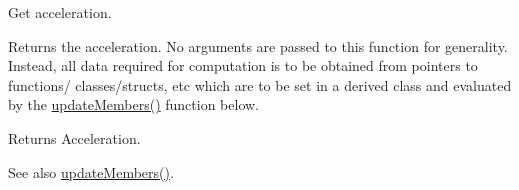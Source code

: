 Get acceleration. 

Returns the acceleration. No arguments are passed to this function for generality. Instead, all data required for computation is to be obtained from pointers to functions/ classes/structs, etc which are to be set in a derived class and evaluated by the \hyperlink{classtudat_1_1basic__astrodynamics_1_1AccelerationModel_a966e85b72300b8cbc99ba60e40108d71}{update\+Members()} function below. \begin{DoxyReturn}{Returns}
Acceleration. 
\end{DoxyReturn}
\begin{DoxySeeAlso}{See also}
\hyperlink{classtudat_1_1basic__astrodynamics_1_1AccelerationModel_a966e85b72300b8cbc99ba60e40108d71}{update\+Members()}. 
\end{DoxySeeAlso}


